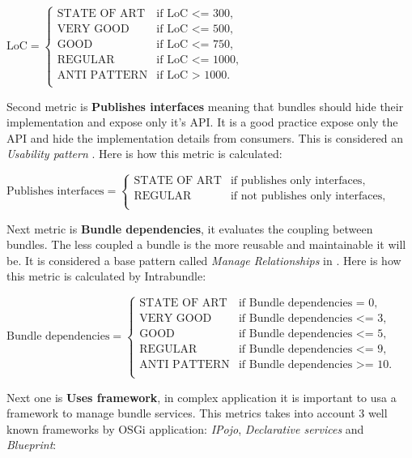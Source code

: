 \(\text{LoC}=\begin{cases}
\text{STATE OF ART}& \text{if LoC <= 300},\\
\text{VERY GOOD}& \text{if LoC <= 500}, \\
\text{GOOD}& \text{if LoC <= 750}, \\
\text{REGULAR}& \text{if LoC <= 1000}, \\
\text{ANTI PATTERN}& \text{if LoC > 1000}. \\
\end{cases} \)\newline  

Second metric is \textbf{Publishes interfaces} meaning that bundles should hide their implementation and expose only it's API. It is a good practice expose only the API and hide the implementation details from consumers. This is considered an \emph{Usability pattern} \citep{Knoernschild 2012}. Here is how this metric is calculated:\newline

\(\text{Publishes interfaces}=\begin{cases}
\text{STATE OF ART}& \text{if publishes only interfaces},\\
\text{REGULAR}& \text{if not publishes only interfaces}, \\
\end{cases} \)  \newline

Next metric is \textbf{Bundle dependencies}, it evaluates the coupling between bundles. The less coupled a bundle is the more reusable and maintainable it will be. It is considered a base pattern called \emph{Manage Relationships} in \citep{Knoernschild 2012}. Here is how this metric is calculated by Intrabundle:\newline


\(\text{Bundle dependencies}=\begin{cases}
\text{STATE OF ART}& \text{if Bundle dependencies = 0},\\
\text{VERY GOOD}& \text{if Bundle dependencies <= 3}, \\
\text{GOOD}& \text{if Bundle dependencies <= 5}, \\
\text{REGULAR}& \text{if Bundle dependencies <= 9}, \\
\text{ANTI PATTERN}& \text{if Bundle dependencies >= 10}. \\
\end{cases} \)\newline 

Next one is \textbf{Uses framework}, in complex application it is important to usa a framework to manage bundle services. This metrics takes into account 3 well known frameworks by OSGi application: \emph{IPojo}, \emph{Declarative services} and \emph{Blueprint}: \newline


